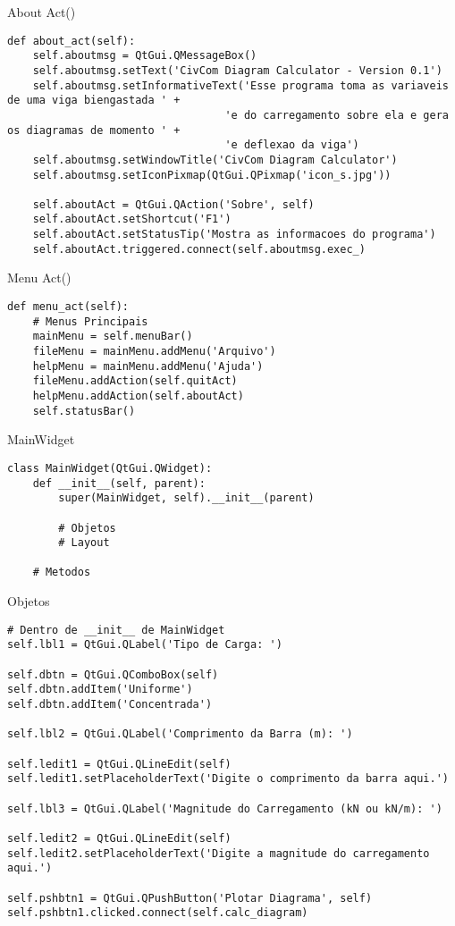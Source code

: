 \documentclass[presentation]{beamer}
\begin{document}
\begin{frame}[fragile,label={sec:orgheadline22}]{About Act()}
 \begin{verbatim}
def about_act(self):
    self.aboutmsg = QtGui.QMessageBox()
    self.aboutmsg.setText('CivCom Diagram Calculator - Version 0.1')
    self.aboutmsg.setInformativeText('Esse programa toma as variaveis de uma viga biengastada ' +
                                  'e do carregamento sobre ela e gera os diagramas de momento ' +
                                  'e deflexao da viga')
    self.aboutmsg.setWindowTitle('CivCom Diagram Calculator')
    self.aboutmsg.setIconPixmap(QtGui.QPixmap('icon_s.jpg')) 
    
    self.aboutAct = QtGui.QAction('Sobre', self)
    self.aboutAct.setShortcut('F1')
    self.aboutAct.setStatusTip('Mostra as informacoes do programa')
    self.aboutAct.triggered.connect(self.aboutmsg.exec_)
\end{verbatim}
\end{frame}
\begin{frame}[fragile,label={sec:orgheadline23}]{Menu Act()}
 \begin{verbatim}
def menu_act(self):
    # Menus Principais
    mainMenu = self.menuBar() 
    fileMenu = mainMenu.addMenu('Arquivo')           
    helpMenu = mainMenu.addMenu('Ajuda')                   
    fileMenu.addAction(self.quitAct)                     
    helpMenu.addAction(self.aboutAct)                  
    self.statusBar()
\end{verbatim}
\end{frame}
\begin{frame}[fragile,label={sec:orgheadline24}]{MainWidget}
 \begin{verbatim}
class MainWidget(QtGui.QWidget):                                                           
    def __init__(self, parent):                                                     
        super(MainWidget, self).__init__(parent)
        
        # Objetos
        # Layout
   
    # Metodos
\end{verbatim}
\end{frame}
\begin{frame}[fragile,label={sec:orgheadline25}]{Objetos}
 \begin{verbatim}
# Dentro de __init__ de MainWidget
self.lbl1 = QtGui.QLabel('Tipo de Carga: ')      

self.dbtn = QtGui.QComboBox(self)
self.dbtn.addItem('Uniforme')  
self.dbtn.addItem('Concentrada')   

self.lbl2 = QtGui.QLabel('Comprimento da Barra (m): ')

self.ledit1 = QtGui.QLineEdit(self) 
self.ledit1.setPlaceholderText('Digite o comprimento da barra aqui.')  

self.lbl3 = QtGui.QLabel('Magnitude do Carregamento (kN ou kN/m): ')

self.ledit2 = QtGui.QLineEdit(self)
self.ledit2.setPlaceholderText('Digite a magnitude do carregamento aqui.')

self.pshbtn1 = QtGui.QPushButton('Plotar Diagrama', self)
self.pshbtn1.clicked.connect(self.calc_diagram)
\end{verbatim}
\end{frame}
\end{document}
